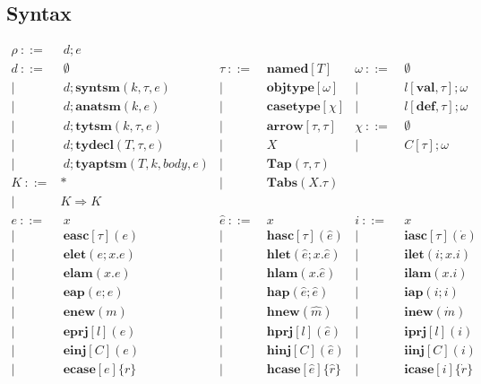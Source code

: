 \documentclass[letterpaper, notitlepage]{article}
\begin{document}
\subsection{Syntax}
\[
\begin{array}{rlrlrl}
	\rho		~::=&~ {d};e\\				
	{d}		~::=&~ \emptyset								&\tau 		~::=&~ \mathbf{named}[T]	& \omega 		~::=&~ 	\emptyset\\
				| ~	&~ {d}; \mathbf{syntsm}(k,\tau,e)	&|~	& ~ \mathbf{objtype}[\omega]		& |~&  	~l[\mathbf{val}, \tau];\omega\\
				| ~	&~ {d}; \mathbf{anatsm}(k,e)		&|~	& ~ \mathbf{casetype}[\chi]			& |~&	~l[\mathbf{def}, \tau];\omega\\
				| ~	&~ {d};\mathbf{tytsm}(k,\tau,e)				&|~ & ~ \mathbf{arrow}[\tau, \tau]		& \chi 			~::=&~	\emptyset ~ \\
				| ~ &~ {d};\mathbf{tydecl}(T,\tau,e)			&|~	& ~ X									& |~&	~C[\tau];\omega\\
				| ~ &~ {d};\mathbf{tyaptsm}(T,k,body,e)			&|~ & ~ \mathbf{Tap}(\tau,\tau)\\
	K           ~::=& *											&|~ & ~ \mathbf{Tabs}(X.\tau)\\
				| ~ & K\Rightarrow K\\
	e 			~::=&~ x 								&\hat{e}	~::=&~ 	x 										& i 		~::=&~ 	x\\
				| ~ &~ \mathbf{easc}[\tau](e)			& 		 	| ~ &~ 	\mathbf{hasc}[\tau](\hat{e})			& 		 	| ~ &~	\mathbf{iasc}[\tau](\dot{e})\\
				| ~ &~ \mathbf{elet}(e; x.e)     		& 		 	| ~ &~ 	\mathbf{hlet}(\hat{e}; x.\hat{e})		& 		 	| ~ &~	\mathbf{ilet}(i;x.i)\\
				| ~ &~ \mathbf{elam}(x.e)     			& 		 	| ~ &~ 	\mathbf{hlam}(x.\hat{e})				& 		 	| ~ &~	\mathbf{ilam}(x.i)\\
				| ~ &~ \mathbf{eap}(e;e)     			& 		 	| ~ &~ 	\mathbf{hap}(\hat{e};\hat{e})			& 		 	| ~ &~	\mathbf{iap}(i;i)\\
				| ~ &~ \mathbf{enew}(m)     			& 		 	| ~ &~	\mathbf{hnew}(\hat{m})					& 		 	| ~ &~	\mathbf{inew}(\dot{m})\\
				| ~ &~ \mathbf{eprj}[l](e)     			& 		 	| ~ &~	\mathbf{hprj}[l](\hat{e})				& 		 	| ~ &~	\mathbf{iprj}[l](i)\\
				| ~ &~ \mathbf{einj}[C](e)     			& 		 	| ~ &~	\mathbf{hinj}[C](\hat{e})				& 		 	| ~ &~	\mathbf{iinj}[C](i)\\
				| ~ &~ \mathbf{ecase}[e]\{r\}     		& 		 	| ~ &~	\mathbf{hcase}[\hat{e}]\{\hat{r}\}		& 		 	| ~ &~	\mathbf{icase}[i]\{\dot{r}\}\\

\end{array}\]
\end{document}
